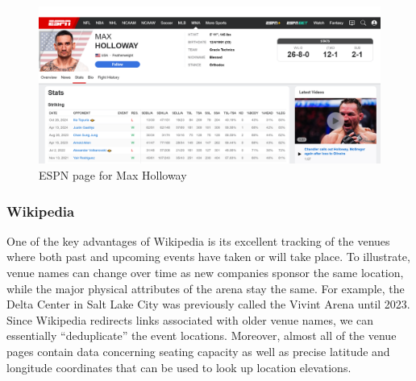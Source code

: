 \documentclass[12pt,twoside]{report}
\begin{document}
\begin{figure}[htb]
    \centering
    \includegraphics[width=0.6\linewidth]{figures/espn1.png}
    \caption{ESPN page for Max Holloway}
\end{figure}


\subsubsection{Wikipedia}

One of the key advantages of Wikipedia is its excellent tracking of the venues where both past and upcoming events have taken or will take place. To illustrate, venue names can change over time as new companies sponsor the same location, while the major physical attributes of the arena stay the same. For example, the Delta Center in Salt Lake City was previously called the Vivint Arena until 2023. Since Wikipedia redirects links associated with older venue names, we can essentially ``deduplicate'' the event locations. Moreover, almost all of the venue pages contain data concerning seating capacity as well as precise latitude and longitude coordinates that can be used to look up location elevations.
\end{document}
